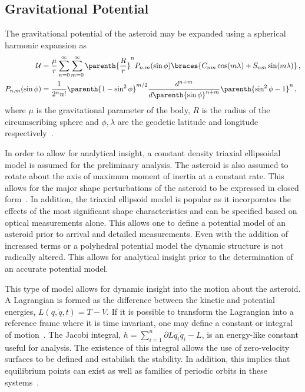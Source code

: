 \documentclass[11pt]{article} %
\begin{document}
\subsection{Gravitational Potential}
The gravitational potential of the asteroid may be expanded using a spherical harmonic expansion as
\begin{align*}
	\mathcal{U} &= \frac{\mu}{r} \sum_{n=0}^\infty \sum_{m=0}^\infty \parenth{\frac{R}{r}}^nP_{n,m}(\sin \phi) \braces{ C_{nm} \cos(m \lambda) + S_{nm} \sin(m \lambda)} \, , \\
	P_{n,m}(\sin \phi) &= \frac{1}{2^n n !} \parenth{1 - \sin^2 \phi}^{m/2} \frac{d^{n+m}}{d \parenth{\sin \phi}^{n+m}} \parenth{\sin^2 \phi -1}^n \, ,
\end{align*}
where \( \mu \) is the gravitational parameter of the body, \( R \) is the radius of the circumscribing sphere and \( \phi, \lambda \) are the geodetic latitude and longitude respectively~\cite{vallado2001}.

In order to allow for analytical insight, a constant density triaxial ellipsoidal model is assumed for the preliminary analysis. 
The asteroid is also assumed to rotate about the axis of maximum moment of inertia at a constant rate.
This allows for the major shape perturbations of the asteroid to be expressed in closed form~\cite{scheeres1994}.
In addition, the triaxial ellipsoid model is popular as it incorporates the effects of the most significant shape characteristics and can be specified based on optical measurements alone.
This allows one to define a potential model of an asteroid prior to arrival and detailed measurements. 
Even with the addition of increased terms or a polyhedral potential model the dynamic structure is not radically altered. 
This allows for analytical insight prior to the determination of an accurate potential model.

This type of model allows for dynamic insight into the motion about the asteroid.
A Lagrangian is formed as the difference between the kinetic and potential energies, \( L(q, \dot{q}, t) =T - V \).
If it is possible to transform the Lagrangian into a reference frame where it is time invariant, one may define a constant or integral of motion~\cite{greenwood1988}.
The Jacobi integral, \( h = \sum_{i=1}^n \partial{L}{\dot{q}_i} \dot{q}_i - L \), is an energy-like constant useful for analysis.
The existence of this integral allows the use of zero-velocity surfaces to be defined and estabilish the stability.
In addition, this implies that equilibrium points can exist as well as families of periodic orbits in these systems~\cite{scheeres2012}.
 
\end{document}
